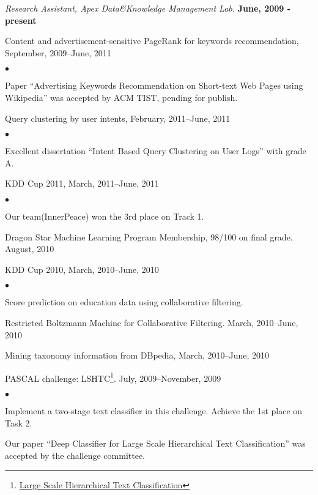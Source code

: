 \documentclass[margin,line]{res}
\newenvironment{list1}{
  \begin{list}{\ding{113}}{%
      \setlength{\itemsep}{0in}
      \setlength{\parsep}{0in} \setlength{\parskip}{0in}
      \setlength{\topsep}{0in} \setlength{\partopsep}{0in} 
      \setlength{\leftmargin}{0.17in}}}{\end{list}}
\newenvironment{list2}{
  \begin{list}{$\bullet$}{%
      \setlength{\itemsep}{0in}
      \setlength{\parsep}{0in} \setlength{\parskip}{0in}
      \setlength{\topsep}{0in} \setlength{\partopsep}{0in} 
      \setlength{\leftmargin}{0.2in}}}{\end{list}}
\begin{document}
\begin{resume}
{\em Research Assistant, Apex Data\&Knowledge Management Lab.} \hfill {\bf June, 2009 - present}\\
\vspace*{-.1in}
\begin{list1}
\item[] Content and advertisement-sensitive PageRank for keywords recommendation, September, 2009--June, 2011
\begin{list2}
	\vspace*{.05in}
\item Paper ``Advertising Keywords Recommendation on Short-text Web Pages using Wikipedia'' was accepted by ACM TIST, pending for publish.
\end{list2}
\item[] Query clustering by user intents, February, 2011--June, 2011
\begin{list2}
	\vspace*{.05in}
\item Excellent dissertation ``Intent Based Query Clustering on User Logs'' with grade A.
\end{list2}
\item[] KDD Cup 2011, March, 2011--June, 2011
\begin{list2}
	\vspace*{.05in}
\item Our team(InnerPeace) won the 3rd place on Track 1.
\end{list2}
\item[] Dragon Star Machine Learning Program Membership, 98/100 on final grade. August, 2010
\item[] KDD Cup 2010, March, 2010--June, 2010
 \begin{list2}
	\vspace*{.05in}
\item Score prediction on education data using collaborative filtering. 
\end{list2}
\item[] Restricted Boltzmann Machine for Collaborative Filtering. March, 2010--June, 2010
\item[] Mining taxonomy information from DBpedia, March, 2010--June, 2010
\item[] PASCAL challenge: LSHTC\footnote {\href{http://lshtc.iit.demokritos.gr/}{Large Scale Hierarchical Text Classification}}. July, 2009--November, 2009
\begin{list2}
	\vspace*{.05in}
\item Implement a two-stage text classifier in this challenge. Achieve the 1st place on Task 2.
\item Our paper ``Deep Classifier for Large Scale Hierarchical Text Classification'' was accepted by the challenge committee. 
\end{list2}
\end{list1}
\vspace*{-.1in}


\end{resume}
\end{document}
